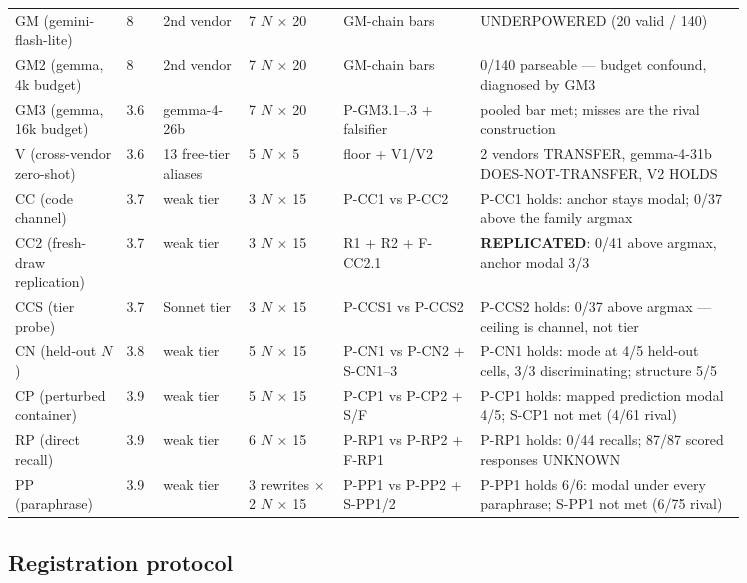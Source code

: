 \begin{center}
\begin{scriptsize}
\begin{tabular}{@{}p{0.13\linewidth}p{0.04\linewidth}p{0.10\linewidth}p{0.11\linewidth}p{0.16\linewidth}p{0.31\linewidth}@{}}
GM (gemini-flash-lite) & 8 & 2nd vendor & 7 $N$ $\times$ 20 & GM-chain bars & UNDERPOWERED (20 valid / 140) \\
GM2 (gemma, 4k budget) & 8 & 2nd vendor & 7 $N$ $\times$ 20 & GM-chain bars & 0/140 parseable --- budget confound, diagnosed by GM3 \\
GM3 (gemma, 16k budget) & 3.6 & gemma-4-26b & 7 $N$ $\times$ 20 & P-GM3.1--.3 + falsifier & pooled bar met; misses are the rival construction \\
V (cross-vendor zero-shot) & 3.6 & 13 free-tier aliases & 5 $N$ $\times$ 5 & floor + V1/V2 & 2 vendors TRANSFER, gemma-4-31b DOES-NOT-TRANSFER, V2 HOLDS \\
CC (code channel) & 3.7 & weak tier & 3 $N$ $\times$ 15 & P-CC1 vs P-CC2 & P-CC1 holds: anchor stays modal; 0/37 above the family argmax \\
CC2 (fresh-draw replication) & 3.7 & weak tier & 3 $N$ $\times$ 15 & R1 + R2 + F-CC2.1 & \textbf{REPLICATED}: 0/41 above argmax, anchor modal 3/3 \\
CCS (tier probe) & 3.7 & Sonnet tier & 3 $N$ $\times$ 15 & P-CCS1 vs P-CCS2 & P-CCS2 holds: 0/37 above argmax --- ceiling is channel, not tier \\
CN (held-out $N$) & 3.8 & weak tier & 5 $N$ $\times$ 15 & P-CN1 vs P-CN2 + S-CN1--3 & P-CN1 holds: mode at 4/5 held-out cells, 3/3 discriminating; structure 5/5 \\
CP (perturbed container) & 3.9 & weak tier & 5 $N$ $\times$ 15 & P-CP1 vs P-CP2 + S/F & P-CP1 holds: mapped prediction modal 4/5; S-CP1 not met (4/61 rival) \\
RP (direct recall) & 3.9 & weak tier & 6 $N$ $\times$ 15 & P-RP1 vs P-RP2 + F-RP1 & P-RP1 holds: 0/44 recalls; 87/87 scored responses UNKNOWN \\
PP (paraphrase) & 3.9 & weak tier & 3 rewrites $\times$ 2 $N$ $\times$ 15 & P-PP1 vs P-PP2 + S-PP1/2 & P-PP1 holds 6/6: modal under every paraphrase; S-PP1 not met (6/75 rival) \\
\bottomrule
\end{tabular}
\end{scriptsize}
\end{center}

\subsection{Registration protocol}

